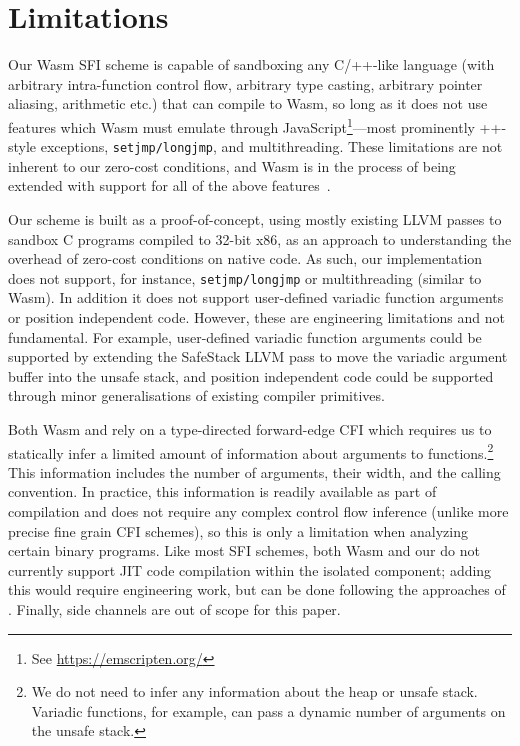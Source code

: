 \section{Limitations}
\label{sec:limitations}
%
Our Wasm SFI scheme is capable of sandboxing any C/\C++-like language (with arbitrary
intra-function control flow, arbitrary type casting, arbitrary pointer aliasing,
arithmetic etc.) that can compile to Wasm, so long as it does not use
features which Wasm must emulate through JavaScript\footnote{See
\url{https://emscripten.org/}}\dash---most prominently \C++-style exceptions,
\texttt{setjmp/longjmp}, and multithreading.
%
These limitations are not inherent to our zero-cost conditions, and Wasm is in
the process of being extended with support for all of the above
features~\cite{10.1145/3360559,wasmeh}.

Our \trsegmentsfi scheme is built as a proof-of-concept, using mostly existing
LLVM passes to sandbox C programs compiled to 32-bit x86, as an approach to understanding the overhead of zero-cost conditions on native code.
%
As such, our \trsegmentsfi implementation does not support, for instance,
\texttt{setjmp/longjmp} or multithreading (similar to Wasm).
%
In addition it does not support user-defined variadic function arguments or position
independent code.
%
However, these are engineering limitations and not fundamental.
%
For example, user-defined variadic function arguments could be supported by extending the SafeStack LLVM pass to move the
variadic argument buffer into the unsafe stack, and position independent code could be supported
through minor generalisations of existing compiler primitives.

Both Wasm and \trsegmentsfi rely on a type-directed forward-edge CFI which requires us to statically infer a limited amount of information about arguments to functions.\footnote{We do not need to infer any information about the heap or unsafe stack. Variadic functions, for example, can pass a dynamic number of arguments on the unsafe stack.}
%
This information includes the number of arguments, their width, and the calling convention.
%
In practice, this information is readily available as part of compilation and
does not require any complex control flow inference (unlike more precise fine
grain CFI schemes), so this is only a limitation when analyzing certain
binary programs.
%
Like most SFI schemes, both Wasm and our \trsegmentsfi do not currently
support JIT code compilation within the isolated component; adding this would
require engineering work, but can be done following the approaches of
\cite{nacl-jit, vahldiek-oberwagner_erim_2019}.
%
Finally, side channels are out of scope for this paper.
